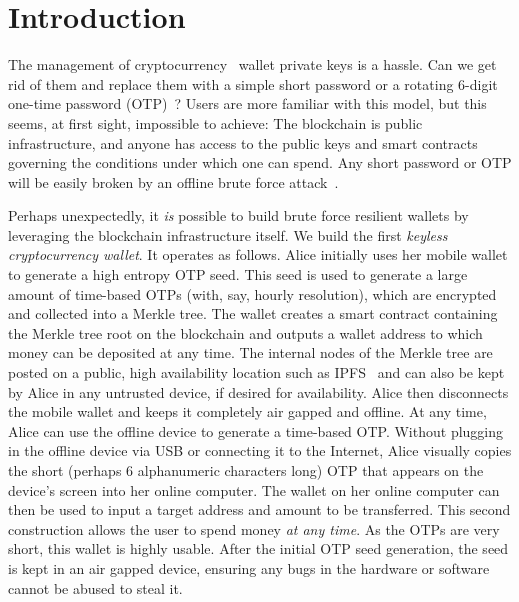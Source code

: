 \section{Introduction}

The management of cryptocurrency~\cite{bitcoin} wallet
private keys is a hassle.
Can we get rid of them and replace them with a simple short password or
a rotating $6$-digit one-time password (OTP)~\cite{rfc6238,rfc4226}? Users are more familiar with this
model, but this seems, at first sight, impossible to achieve:
The blockchain is public infrastructure, and anyone has access to the
public keys and smart contracts~\cite{buterin,wood} governing the conditions under which
one can spend. Any short password or OTP will be easily broken by an offline
brute force attack~\cite{brain-drain}.

Perhaps unexpectedly, it \emph{is} possible to build brute force resilient wallets
by leveraging the blockchain infrastructure itself.
We build the first \emph{keyless cryptocurrency wallet}.
It operates as follows.
Alice initially uses her mobile wallet to generate a high entropy OTP seed.
This seed is used to generate
a large amount of time-based OTPs (with, say, hourly resolution), which are encrypted
and collected into a Merkle tree. The wallet creates a smart contract containing the
Merkle tree root on the blockchain and outputs a wallet address to which money can
be deposited at any time. The internal nodes of the Merkle tree are posted on a public,
high availability location such as IPFS~\cite{ipfs} and can also be kept by Alice
in any untrusted device, if desired for availability. Alice then disconnects the mobile wallet and keeps it
completely air gapped and offline. At any time, Alice can use the offline device to generate
a time-based OTP. Without plugging in the offline device via USB or connecting it
to the Internet, Alice visually copies the short (perhaps $6$ alphanumeric characters long)
OTP that appears on the device's screen into her online computer. The wallet on
her online computer can then be used to input a target address and amount to be transferred.
This second construction allows the user
to spend money \emph{at any time}. As the OTPs are very short, this wallet is highly usable.
After the initial OTP seed generation, the seed is kept in an
air gapped device, ensuring any bugs in the hardware or software cannot be abused
to steal it.


